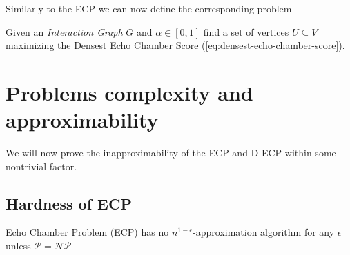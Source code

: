 Similarly to the \acrshort{ECP} we can now define the corresponding problem

\begin{problem}
Given an \emph{Interaction Graph} $G$ and $\alpha \in [0, 1]$ find a set of vertices $U \subseteq
	V$ maximizing the Densest Echo Chamber Score (\autoref{eq:densest-echo-chamber-score}).
\end{problem}

\section{Problems complexity and approximability}%
\label{sec:problem_complexity_and_approximability}

We will now prove the inapproximability of the \acrshort{ECP} and
\acrshort{D-ECP} within some nontrivial factor.

\subsection{Hardness of \acrshort{ECP}}%
\label{sub:ecp-hardness}

\begin{theorem}
	\label{th:approximability}
	Echo Chamber Problem (ECP) has no $n^{1-\epsilon} $-approximation algorithm for
	any $\epsilon$ unless $\mathcal{P} = \mathcal{NP}  $
\end{theorem}


